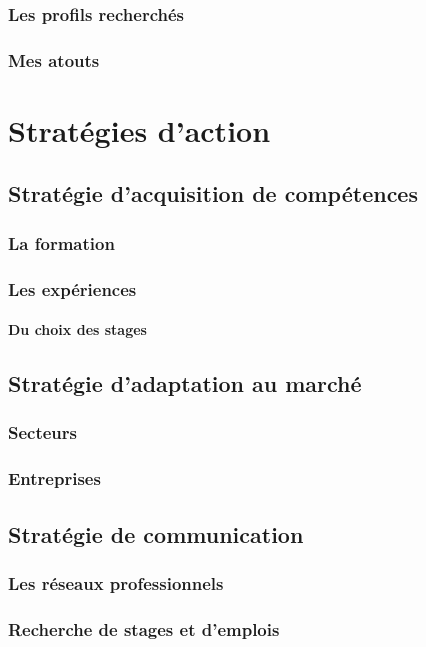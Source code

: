 \documentclass[a4paper,12pt, draft]{report}
\begin{document}
\section{Les profils recherchés}
\section{Mes atouts}

\part{Stratégies d'action}

\chapter{Stratégie d'acquisition de compétences}
\section{La formation}
\section{Les expériences}
\subsection{Du choix des stages}

\chapter{Stratégie d'adaptation au marché}
\section{Secteurs}
\section{Entreprises}

\chapter{Stratégie de communication}
\section{Les réseaux professionnels}
\section{Recherche de stages et d'emplois}
\end{document}
